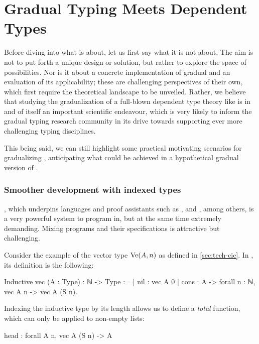 \chapter{Gradual Typing Meets Dependent Types}
\label{chap:gradual-dependent}

\margintoc

Before diving into what  is about, let us first say what it is not about.
The aim is not to put forth a unique design or solution,
but rather to explore the space of possibilities.
Nor is it about a concrete implementation of gradual  and an evaluation of its
applicability; these are challenging perspectives of their own,
which first require the theoretical landscape to be unveiled.
Rather, we believe that studying the gradualization of a full-blown dependent type theory
like  is in and of itself an important scientific endeavour,
which is very likely to inform the gradual typing research community in its drive towards
supporting ever more challenging typing disciplines.

This being said, we can still highlight some practical motivating scenarios
for gradualizing ,
anticipating what could be achieved in a hypothetical gradual version of \eg {}.

\subsection{Smoother development with indexed types}
  \label{sec:indices}
  
, which underpins languages and proof assistants such as ,
 and , among others, is a very powerful system to program in,
but at the same time extremely demanding.
Mixing programs and their specifications is attractive but challenging.

Consider the example of the vector type $\operatorname{Ve}(A,n)$ as defined in \cref{sec:tech-cic}.
In , its definition is the following:

\begin{coqcode}
Inductive vec (A : Type) : ℕ -> Type :=
| nil  : vec A 0
| cons : A -> forall n : ℕ, vec A n -> vec A (S n).
\end{coqcode}

Indexing the inductive type by its length allows us to define a \emph{total}
 function, which can only be applied to non-empty lists:
\begin{coqcode}
  head : forall A n, vec A (S n) -> A
\end{coqcode}
  
